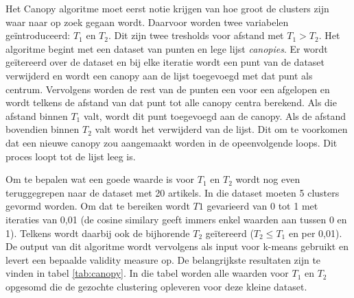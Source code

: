 Het Canopy algoritme moet eerst notie krijgen van hoe groot de clusters zijn waar naar op zoek gegaan wordt. Daarvoor worden twee variabelen ge\"introduceerd: $T_1$ en $T_2$. Dit zijn twee tresholds voor afstand met $T_1 > T_2$. Het algoritme begint met een dataset van punten en lege lijst \textit{canopies}. Er wordt ge\"itereerd over de dataset en bij elke iteratie wordt een punt van de dataset verwijderd en wordt een canopy aan de lijst toegevoegd met dat punt als centrum. Vervolgens worden de rest van de punten een voor een afgelopen en wordt telkens de afstand van dat punt tot alle canopy centra berekend. Als die afstand binnen $T_1$ valt, wordt dit punt toegevoegd aan de canopy. Als de afstand bovendien binnen $T_2$ valt wordt het verwijderd van de lijst. Dit om te voorkomen dat een nieuwe canopy zou aangemaakt worden in de opeenvolgende loops. Dit proces loopt tot de lijst leeg is. 

Om te bepalen wat een goede waarde is voor $T_1$ en $T_2$ wordt nog even teruggegrepen naar de dataset met 20 artikels. In die dataset moeten 5 clusters gevormd worden. Om dat te bereiken wordt $T1$ gevarieerd van 0 tot 1 met iteraties van 0,01 (de cosine similary geeft immers enkel waarden aan tussen 0 en 1). Telkens wordt daarbij ook de bijhorende $T_2$ ge\"itereerd ($T_2 \leq T_1$ en per 0,01). De output van dit algoritme wordt vervolgens als input voor k-means gebruikt en levert een bepaalde validity measure op. De belangrijkste resultaten zijn te vinden in tabel \ref{tab:canopy}. In die tabel worden alle waarden voor $T_1$ en $T_2$ opgesomd die de gezochte clustering opleveren voor deze kleine dataset.

